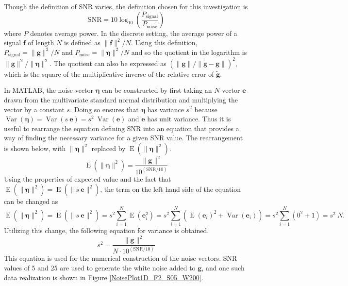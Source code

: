 \documentclass[12pt]{article}
\newcommand{\gdis}{\mathbf{g}}
\newcommand{\gnoise}{\widetilde{\mathbf{g}}}
\newcommand{\SD}{s}	%
\newcommand{\noise}{\bm{\eta}}	%
\newcommand{\Var}{\operatorname{Var}}	%
\newcommand{\E}{\operatorname{E}}	%
\begin{document}
Though the definition of SNR varies, the definition chosen for this investigation is
\begin{equation}
\label{Eq_SNR}
\text{SNR} = 10\log_{10}\left(\frac{P_{\text{signal}}}{P_{\text{noise}}}\right)
\end{equation}
where $P$ denotes average power. In the discrete setting, the average power of a signal $\mathbf{f}$ of length $N$ is defined as $\|\mathbf{f}\|^2/N$. Using this definition, $P_{\text{signal}} = \|\gdis\|^2/N$ and $P_{\text{noise}} = \|\noise\|^2/N$ and so the quotient in the logarithm is $\|\gdis\|^2/\|\noise\|^2$. The quotient can also be expressed as $(\|\gdis\|/\|\gnoise - \gdis\|)^2$, which is the square of the multiplicative inverse of the relative error of $\gnoise$. \par
In MATLAB, the noise vector $\noise$ can be constructed by first taking an $N$-vector $\mathbf{e}$ drawn from the multivariate standard normal distribution and multiplying the vector by a constant $\SD$. Doing so ensures that $\noise$ has variance $\SD^2$ because $\Var(\noise) = \Var(\SD\:\mathbf{e}) = \SD^2\:\Var(\mathbf{e})$ and $\mathbf{e}$ has unit variance. Thus it is useful to rearrange the equation defining SNR into an equation that provides a way of finding the necessary variance for a given SNR value. The rearrangement is shown below, with $\|\noise\|^2$ replaced by $\E(\|\noise\|^2)$.
\[\E(\|\noise\|^2) = \frac{\|\gdis\|^2}{10^{(\text{SNR}/10)}}\]
Using the properties of expected value and the fact that $\E(\|\noise\|^2) = \E(\|\SD\:\mathbf{e}\|^2)$, the term on the left hand side of the equation can be changed as
\[\E(\|\noise\|^2) = \E(\|\SD\:\mathbf{e}\|^2) = \SD^2 \sum_{i=1}^N \E(\mathbf{e}_i^2) = \SD^2 \sum_{i=1}^N \left(\E(\mathbf{e}_i)^2 + \Var(\mathbf{e}_i)\right) = \SD^2 \sum_{i=1}^N \left(0^2 + 1\right) = \SD^2\:N.\]
Utilizing this change, the following equation for variance is obtained.
\begin{equation}
\label{Eq_Var}
\SD^2 = \frac{\|\gdis\|^2}{N \cdot 10^{(\text{SNR}/10)}}
\end{equation}
This equation is used for the numerical construction of the noise vectors. SNR values of 5 and 25 are used to generate the white noise added to $\gdis$, and one such data realization is shown in Figure \ref{NoisePlot1D_F2_S05_W200}. \par
\end{document}
